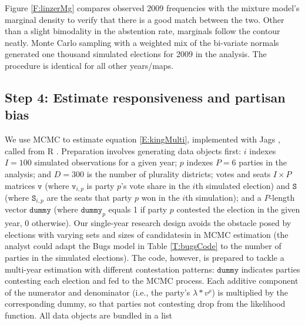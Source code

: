 \documentclass[letter,12pt]{article}
\begin{document}
Figure \ref{F:linzerMg} compares observed 2009 frequencies with the mixture model's marginal density to verify that there is a good match between the two. Other than a slight bimodality in the abstention rate, marginals follow the contour neatly. Monte Carlo sampling with a weighted mix of the bi-variate normals generated one thousand simulated elections for 2009 in the analysis. The procedure is identical for all other years/maps. 


\subsection*{Step 4: Estimate responsiveness and partisan bias}

We use MCMC to estimate equation \ref{E:kingMulti}, implemented with Jags \citep{jags.cite}, called from R \citep[with library R2Jags,][]{r.r2jags}. Preparation involves generating data objects first: $i$ indexes $I=100$ simulated observations for a given year; $p$ indexes $P=6$ parties in the analysis; and $D=300$ is the number of plurality districts; votes and seats $I\times P$ matrices $\texttt{v}$ (where $\texttt{v}_{i,p}$ is party $p$'s vote share in the $i$th simulated election) and $\texttt{S}$ (where $\texttt{S}_{i,p}$ are the seats that party $p$ won in the $i$th simulation); and a $P$-length vector $\texttt{dummy}$ (where $\texttt{dummy}_p$ equals 1 if party $p$ contested the election in the given year, 0 otherwise). Our single-year research design avoids the obstacle posed by elections with varying sets and sizes of candidatesin in MCMC estimation (the analyst could adapt the Bugs model in Table \ref{T:bugsCode} to the number of parties in the simulated elections). The code, however, is prepared to tackle a multi-year estimation with different contestation patterns: $\texttt{dummy}$ indicates parties contesting each election and fed to the MCMC process. Each additive component of the numerator and denominator (i.e., the party's $\lambda * v^\rho$) is multiplied by the corresponding dummy, so that parties not contesting drop from the likelihood function. All data objects are bundled in a list 
\end{document}
